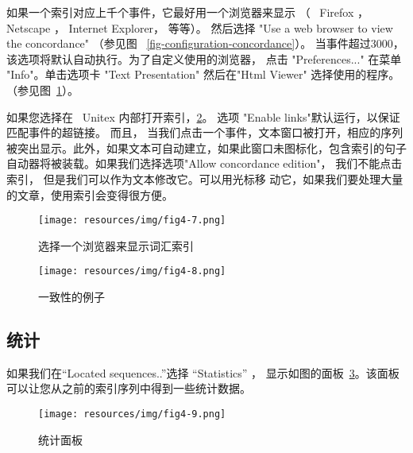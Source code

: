 \bigskip
\noindent 如果一个索引对应上千个事件，它最好用一个浏览器来显示  （ \ Firefox \cite{Firefox}， Netscape \cite{Netscape}， 
Internet Explorer， 等等）。
\newline
然后选择 "Use a web browser to view the concordance" （参见图
	~\ref{fig-configuration-concordance}）。
	当事件超过3000，该选项将默认自动执行。为了自定义使用的浏览器， 点击 "Preferences..." 在菜单 "Info"。单击选项卡 "Text Presentation" 然后在"Html Viewer" 选择使用的程序。
 （参见图~\ref{fig-browser-selection}）。

\bigskip
\noindent {} 如果您选择在 \ Unitex 内部打开索引，\ref{fig-example-concordance}。 
选项 "Enable links"默认运行，以保证匹配事件的超链接。 而且， 当我们点击一个事件，文本窗口被打开，相应的序列被突出显示。此外，如果文本可自动建立，如果此窗口未图标化，包含索引的句子自动器将被装载。如果我们选择选项"Allow concordance edition"， 我们不能点击索引， 但是我们可以作为文本修改它。可以用光标移
动它，如果我们要处理大量的文章，使用索引会变得很方便。


\begin{figure}[h]
\begin{center}
\texttt{[image: resources/img/fig4-7.png]}
\caption{选择一个浏览器来显示词汇索引\label{fig-browser-selection}}
\end{center}
\end{figure}

\begin{figure}[!p]
\begin{center}
\texttt{[image: resources/img/fig4-8.png]}
\caption{一致性的例子\label{fig-example-concordance}}
\end{center}
\end{figure}

\clearpage
\subsection{统计}
\label{section-statistics}
如果我们在``Located sequences..''选择 ``Statistics'' ，
显示如图的面板~\ref{fig-statistics}。该面板可以让您从之前的索引序列中得到一些统计数据。 

\bigskip
\begin{figure}[!h]
\begin{center}
\texttt{[image: resources/img/fig4-9.png]}
\caption{统计面板 \label{fig-statistics}}
\end{center}
\end{figure}


